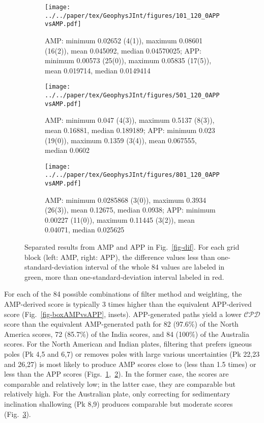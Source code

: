 \begin{figure*}
	\centering
	\begin{subfigure}{1.01\textwidth}
		\texttt{[image: ../../paper/tex/GeophysJInt/figures/101\_120\_0APPvsAMP.pdf]}
		\caption{AMP\@: minimum 0.02652 (4(1)), maximum 0.08601 (16(2)), mean
		0.045092, median 0.04570025; APP\@: minimum 0.00573 (25(0)), maximum
		0.05835 (17(5)), mean 0.019714, median 0.0149414}\label{fig-na-difAMPvsAPP}
	\end{subfigure}
	\vspace{.1em}
	\begin{subfigure}{1.01\textwidth}
		\texttt{[image: ../../paper/tex/GeophysJInt/figures/501\_120\_0APPvsAMP.pdf]}
		\caption{AMP: minimum 0.047 (4(3)), maximum 0.5137 (8(3)), mean
		0.16881, median 0.189189; APP: minimum 0.023 (19(0)), maximum 0.1359
		(3(4)), mean 0.067555, median 0.0602}\label{fig-in-difAMPvsAPP}
	\end{subfigure}
	\vspace{.1em}
	\begin{subfigure}{1.01\textwidth}
		\texttt{[image: ../../paper/tex/GeophysJInt/figures/801\_120\_0APPvsAMP.pdf]}
		\caption{AMP: minimum 0.0285868 (3(0)), maximum 0.3934 (26(3)), mean
		0.12675, median 0.0938; APP: minimum 0.00227 (11(0)), maximum 0.11445
		(3(2)), mean 0.04071, median 0.025625}\label{fig-au-difAMPvsAPP}
	\end{subfigure}
	\caption[Differences of each plate's paleomagnetic APWPs versus its FHM
predicted APWP (AMP vs APP)]{Separated results from AMP and APP in
Fig.~\ref{fig-dif}. For each grid block (left: AMP, right: APP), the difference
values less than one-standard-deviation interval of the whole 84 values are
labeled in green, more than one-standard-deviation interval labeled in
red.}\label{fig-difAMPvsAPP}
\end{figure*}

For each of the 84 possible combinations of filter method and weighting, the
AMP-derived score is typically 3 times higher than the equivalent
APP-derived score (Fig.~\ref{fig-boxAMPvsAPP}, insets). APP-generated paths
yield a lower $\mathcal{CPD}$ score than the equivalent AMP-generated path for
82 (97.6\%) of the North America scores, 72 (85.7\%) of the India scores, and 84
(100\%) of the Australia scores. For the North American and Indian plates,
filtering that prefers igneous poles (Pk 4,5 and 6,7) or removes
poles with large various uncertainties (Pk 22,23 and 26,27) is most likely
to produce AMP scores close to (less than 1.5 times) or less than the APP scores
(Figs.~\ref{fig-na-difAMPvsAPP},~\ref{fig-in-difAMPvsAPP}). In the former case,
the scores are comparable and relatively low; in the latter case, they are
comparable but relatively high. For the Australian plate, only correcting for
sedimentary inclination shallowing (Pk 8,9) produces comparable but moderate
scores (Fig.~\ref{fig-au-difAMPvsAPP}).

